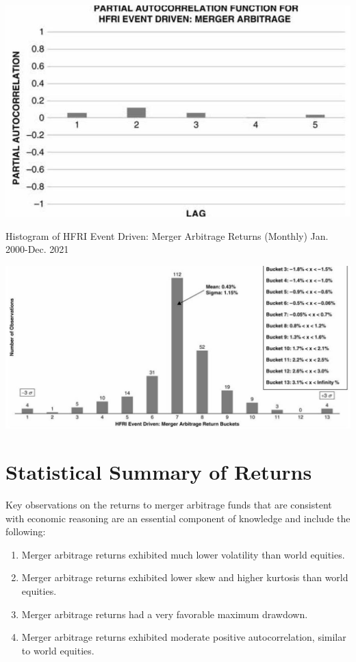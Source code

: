\documentclass[11pt]{article}
\begin{document}
\begin{center}
\includegraphics[max width=\textwidth]{2024_04_09_da1ba80afb4795888518g-5(1)}
\end{center}

Histogram of HFRI Event Driven: Merger Arbitrage Returns (Monthly) Jan. 2000-Dec. 2021

\begin{center}
\includegraphics[max width=\textwidth]{2024_04_09_da1ba80afb4795888518g-5}
\end{center}

\section*{Statistical Summary of Returns}
Key observations on the returns to merger arbitrage funds that are consistent with economic reasoning are an essential component of knowledge and include the following:

\begin{enumerate}
  \item Merger arbitrage returns exhibited much lower volatility than world equities.

  \item Merger arbitrage returns exhibited lower skew and higher kurtosis than world equities.

  \item Merger arbitrage returns had a very favorable maximum drawdown.

  \item Merger arbitrage returns exhibited moderate positive autocorrelation, similar to world equities.

\end{enumerate}
\end{document}
